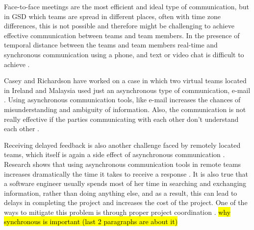 Face-to-face meetings are the most efficient and ideal type of communication, but in GSD which teams are spread in different places, often with time zone differences, this is not possible and therefore might be challenging to achieve effective communication between teams and team members. In the presence of temporal distance between the teams and team members real-time and synchronous communication using a phone, and text or video chat is difficult to achieve \citep{holmstrom2006agile,kommeren2007philips}.

Casey and Richardson have worked on a case in which two virtual teams located in Ireland and Malaysia used just an asynchronous type of communication, e-mail \citep{casey2008impact}. Using asynchronous communication tools, like e-mail increases the chances of misunderstanding and ambiguity of information. Also, the communication is not really effective if the parties communicating with each other don’t understand each other \citep{kommeren2007philips,cataldo2007coordination}.

Receiving delayed feedback is also another challenge faced by remotely located teams, which itself is again a side effect of asynchronous communication \citep{conchuir2006exploring,holmstrom2006agile}. Research shows that using asynchronous communication tools in remote teams increases dramatically the time it takes to receive a response \citep{holmstrom2006global}. It is also true that a software engineer usually spends most of her time in searching and exchanging information, rather than doing anything else, and as a result, this can lead to delays in completing the project and increases the cost of the project. One of the ways to mitigate this problem is through proper project coordination \citep{dumitriu2006issues}. \hl{why synchronous is important (last 2 paragraphs are about it)}
